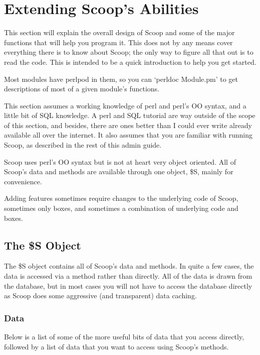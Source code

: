\section{Extending Scoop's Abilities}
\label{hacking}

This section will explain the overall design of Scoop and some of the major functions that will help you program it. This does not by any means cover everything there is to know about Scoop; the only way to figure all that out is to read the code. This is intended to be a quick introduction to help you get started.

Most modules have perlpod in them, so you can `perldoc Module.pm' to get descriptions of most of a given module's functions.

This section assumes a working knowledge of perl and perl's OO syntax, and a little bit of SQL knowledge. A perl and SQL tutorial are way outside of the scope of this section, and besides, there are ones better than I could ever write already available all over the internet. It also assumes that you are familiar with running Scoop, as described in the rest of this admin guide.

Scoop uses perl's OO syntax but is not at heart very object oriented. All of Scoop's data and methods are available through one object, \$S, mainly for convenience.

Adding features sometimes require changes to the underlying code of Scoop, sometimes only boxes, and sometimes a combination of underlying code and boxes.

\subsection{The \$S Object}
\label{hacking-s}

The \$S object contains all of Scoop's data and methods. In quite a few cases, the data is accessed via a method rather than directly. All of the data is drawn from the database, but in most cases you will not have to access the database directly as Scoop does some aggressive (and transparent) data caching.

\subsubsection{Data}

Below is a list of some of the more useful bits of data that you access directly, followed by a list of data that you want to access using Scoop's methods.


